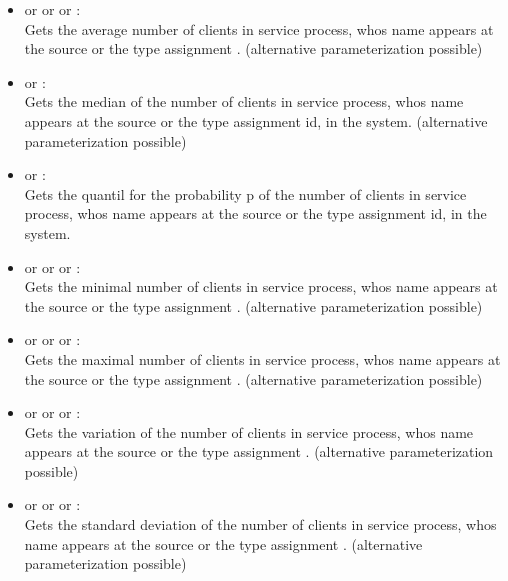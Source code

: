 \begin{itemize}    

\item
{} or  or  or :\\
Gets the average number of clients in service process, whos name appears at the source or the type assignment .
(alternative parameterization possible)

\item
{} or :\\
Gets the median of the number of clients in service process, whos name appears at the source or the type assignment id, in the system.
(alternative parameterization possible)

\item
{} or :\\
Gets the quantil for the probability p of the number of clients in service process, whos name appears at the source or the type assignment id, in the system.

\item
{} or  or  or :\\
Gets the minimal number of clients in service process, whos name appears at the source or the type assignment .
(alternative parameterization possible)

\item
{} or  or  or :\\
Gets the maximal number of clients in service process, whos name appears at the source or the type assignment .
(alternative parameterization possible)

\item
{} or  or  or :\\
Gets the variation of the number of clients in service process, whos name appears at the source or the type assignment .
(alternative parameterization possible)

\item
{} or  or  or :\\
Gets the standard deviation of the number of clients in service process, whos name appears at the source or the type assignment .
(alternative parameterization possible)


\end{itemize}
